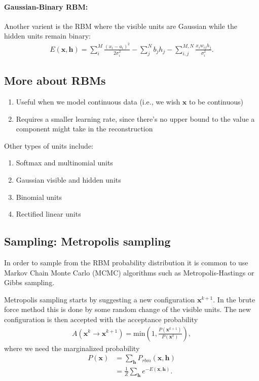 \documentclass[%
oneside,                 %
final,                   %
10pt]{article}
\begin{document}
\paragraph{Gaussian-Binary RBM:}

Another varient is the RBM where the visible units are Gaussian while the hidden units remain binary:
\begin{align}
	E(\mathbf{x}, \mathbf{h}) = \sum_i^M \frac{(x_i - a_i)^2}{2\sigma_i^2} - \sum_j^N b_j h_j - \sum_{i,j}^{M,N} \frac{x_i w_{ij} h_j}{\sigma_i^2}. 
\end{align}



\subsection{More about RBMs}
\begin{enumerate}
\item Useful when we model continuous data (i.e., we wish $\mathbf{x}$ to be continuous)

\item Requires a smaller learning rate, since there's no upper bound to the value a component might take in the reconstruction
\end{enumerate}

\noindent
Other types of units include:
\begin{enumerate}
\item Softmax and multinomial units

\item Gaussian visible and hidden units

\item Binomial units

\item Rectified linear units
\end{enumerate}

\noindent
\subsection{Sampling: Metropolis sampling}
In order to sample from the RBM probability distribution it is common to use Markov Chain Monte Carlo (MCMC) algorithms such as Metropolis-Hastings or Gibbs sampling.



Metropolis sampling starts by suggesting a new configuration $\bm{x}^{k+1}$. In the brute force method this is done by some random change of the visible units. The new configuration is then accepted with the acceptance probability
\begin{align}
	A(\bm{x}^k \rightarrow \bm{x}^{k+1}) = \text{min} (1, \frac{P(\bm{x}^{k+1})}{P(\bm{x}^k)}),
\end{align} 
where we need the marginalized probability
\begin{align}
	P(\bm{x})  &= \sum_\mathbf{h} P_{rbm}(\mathbf{x}, \mathbf{h}) \\
				&= \frac{1}{Z}\sum_\mathbf{h} e^{-E(\mathbf{x}, \mathbf{h})}.
\end{align}
\end{document}
